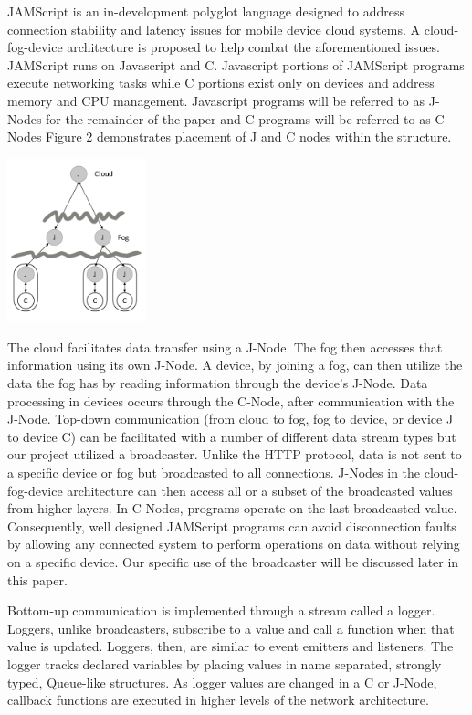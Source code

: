\documentclass{article}
\newenvironment{Figure}
  {\par\medskip\noindent\minipage{\linewidth}}
  {\endminipage\par\medskip}
\begin{document}
\begin{multicols}{2}

JAMScript is an in-development polyglot language designed to address connection stability and latency issues for mobile device cloud systems. A cloud-fog-device architecture is proposed to help combat the aforementioned issues. JAMScript runs on Javascript and C.
Javascript portions of JAMScript programs execute networking tasks while C portions exist only on devices and address memory and CPU management. Javascript programs will be referred to as J-Nodes for the remainder of the paper and C programs will be referred to as C-Nodes Figure 2 demonstrates placement of J and C nodes within the structure. 
\begin{Figure}
 \centering
 \includegraphics[width=4cm]{JAMScript_NN_Architecture}
\end{Figure}
\newpage
The cloud facilitates data transfer using a J-Node. The fog then accesses that information using its own J-Node. A device, by joining a fog, can then utilize the data the fog has by reading information through the device's J-Node. Data processing in devices occurs through the C-Node, after communication with the J-Node. Top-down communication (from cloud to fog, fog to device, or device J to device C) can be facilitated with a number of different data stream types but our project utilized a broadcaster.  Unlike the HTTP protocol, data is not sent to a specific device or fog but broadcasted to all connections. J-Nodes in the cloud-fog-device architecture can then access all or a subset of the broadcasted values from higher layers.  In C-Nodes, programs operate on the last broadcasted value. Consequently, well designed JAMScript programs can avoid disconnection faults by allowing any connected system to perform operations on data without relying on a specific device. Our specific use of the broadcaster will be discussed later in this paper. 
\par
Bottom-up communication is implemented through a stream called a logger. Loggers, unlike broadcasters, subscribe to a value and call a function when that value is updated. Loggers, then, are similar to event emitters and listeners. The logger tracks declared variables by placing values in name separated, strongly typed, Queue-like structures.  As logger values are changed in a C or J-Node, callback functions are executed in higher levels of the network architecture.

\end{multicols}
\end{document}
